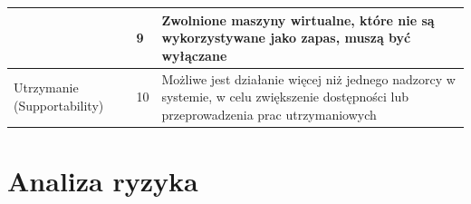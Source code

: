 \documentclass[12pt]{article}
\begin{document}
\begin{center}
\begin{table}[h!]
\begin{tabular}{|p{}|p{}|p{}|}
			                                                & 9            & Zwolnione maszyny wirtualne, które nie są wykorzystywane jako zapas, muszą być wyłączane                                                                                \\ \hline
			\multirow[t]{3}{=}{Utrzymanie (Supportability)} & 10           & Możliwe jest działanie więcej niż jednego nadzorcy w systemie, w celu zwiększenie dostępności lub przeprowadzenia prac utrzymaniowych                                   \\
			\hline
		\end{tabular}
	\end{table}
\end{center}

\newpage

\section{Analiza ryzyka}
\end{document}
